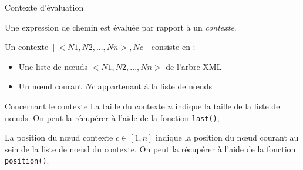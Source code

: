 \begin{frame}{Contexte d'évaluation}

Une expression de chemin est évaluée par rapport à un \textit{contexte}.

\bigskip

Un contexte $[< N1,N2,...,Nn >,Nc]$ consiste en \cite{WDMD} :
\begin{itemize}
\item Une liste de n{\oe}uds $< N1,N2,...,Nn >$ de l'arbre XML
\item Un n{\oe}ud courant $Nc$ appartenant à la liste de n{\oe}uds
\end{itemize}

\medskip

\begin{block}{Concernant le contexte}
La taille du contexte $n$ indique la taille de la liste de n{\oe}uds. On peut la récupérer à l'aide de la fonction \verb?last()?;

\medskip

La position du n{\oe}ud contexte $c \in [1, n]$ indique la position du n{\oe}ud courant au sein de la liste de n{\oe}ud du contexte.
On peut la récupérer à l'aide de la fonction \verb?position()?.
\end{block}


\end{frame}


